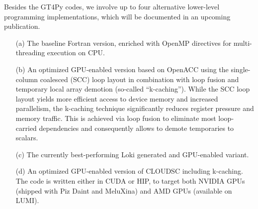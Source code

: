 \documentclass[gmd,manuscript,online]{copernicus}
\theoremstyle{theorem}
\theoremstyle{definition}
\theoremstyle{remark}
\theoremstyle{proposition}
\begin{document}
	Besides the GT4Py codes, we involve up to four alternative lower-level programming implementations, which will be documented in an upcoming publication.
	\begin{itemize}
		\item[(a)] The baseline Fortran version, enriched with OpenMP directives for multi-threading execution on CPU.
		\item[(b)] An optimized GPU-enabled version based on OpenACC using the single-column coalesced (SCC) loop layout in combination with loop fusion and temporary local array demotion (so-called ``k-caching''). While the SCC loop layout yields more efficient access to device memory and increased parallelism, the k-caching technique significantly reduces register pressure and memory traffic. This is achieved via loop fusion to eliminate most loop-carried dependencies and consequently allows to demote temporaries to scalars.
		\item[(c)] The currently best-performing Loki generated and GPU-enabled variant.
		\item[(d)] An optimized GPU-enabled version of CLOUDSC including k-caching. The code is written either in CUDA or HIP, to target both NVIDIA GPUs (shipped with Piz Daint and MeluXina) and AMD GPUs (available on LUMI).
	\end{itemize}
\end{document}
